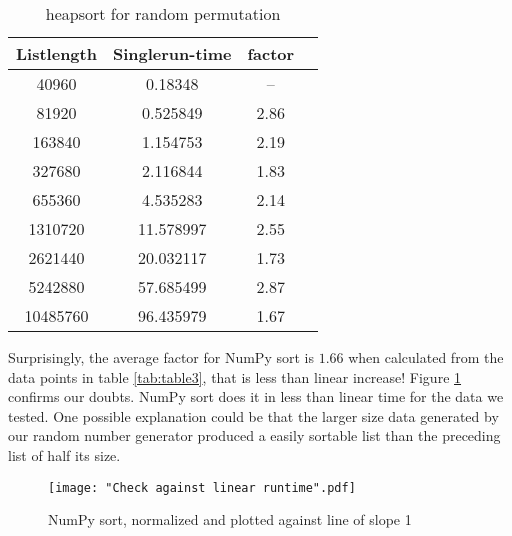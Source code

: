 \documentclass[sigconf, nonacm, natbib, screen, balance=False]{acmart}
\begin{document}
\begin{table}[ht]
\caption{heapsort for random permutation }
\label{tab:table2}
\begin{center}
\begin{tabular}{|c|c|c|c|} 
\hline
\textbf{Listlength} & 	\textbf{Singlerun-time} & \textbf{factor} \\ 
\hline
40960 &  0.18348 &  --  \\ 
81920 &  0.525849 &  2.86 \\ 
163840 &  1.154753 &  2.19 \\ 
327680 &  2.116844 &  1.83 \\ 
655360 &  4.535283 &  2.14 \\ 
1310720 &  11.578997 &  2.55 \\ 
2621440 &  20.032117 &  1.73 \\ 
5242880 &  57.685499 &  2.87 \\ 
10485760 &  96.435979 &  1.67 \\ 
\hline
\end{tabular}
\end{center}
\end{table}

 Surprisingly, the average factor for NumPy sort is $1.66$ when calculated from the data points in table \ref{tab:table3}, that is less than linear increase!  Figure \ref{fig:NumPylinear} confirms our doubts. NumPy sort does it in less than linear time for the data we tested. One possible explanation could be that the larger size data generated by our random number generator produced a easily sortable list than the preceding list of half its size.

\begin{figure}[ht]
\texttt{[image: "Check against linear runtime".pdf]}
    \caption{NumPy sort, normalized and plotted against line of slope 1 }
    \label{fig:NumPylinear}
\end{figure}
\end{document}
